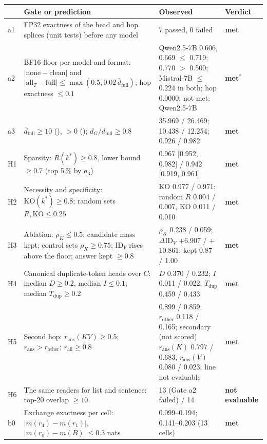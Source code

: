 \begin{tabular}{p{}p{}p{}p{}}
\toprule
 & Gate or prediction & Observed & Verdict \\
\midrule
a1 & FP32 exactness of the head and hop splices (unit tests) before any model & 7 passed, 0 failed & \textbf{met} \\
a2 & BF16 floor per model and format: $|\text{none}-\text{clean}|$ and $|\text{all}_T-\text{full}| \leq \max(0.5, 0.02\,\bar d_{\mathrm{full}})$; hop exactness $\leq 0.1$ & Qwen2.5-7B \fmtOpt{} 0.606, 0.669 $\leq$ 0.719; \fmtPost{} 0.770 $>$ 0.500; Mistral-7B $\leq$ 0.224 in both; hop 0.0000; not met: Qwen2.5-7B \fmtPost{} & \textbf{met}$^*$ \\
a3 & $\bar d_{\mathrm{full}} \geq 10$ (\fmtOpt{}), $> 0$ (\fmtPost{}); $d_G/d_{\mathrm{full}} \geq 0.8$ & 35.969 / 26.469; 10.438 / 12.254; 0.926 / 0.982 & \textbf{met} \\
\midrule
H1 & Sparsity: $R(k^*) \geq 0.8$, lower bound $\geq 0.7$ (top 5\,\% by $a_3$) & 0.967 [0.952, 0.982] / 0.942 [0.919, 0.961] & \textbf{met} \\
H2 & Necessity and specificity: $\mathrm{KO}(k^*) \geq 0.8$; random sets $R, \mathrm{KO} \leq 0.25$ & KO 0.977 / 0.971; random $R$ 0.004 / 0.007, KO 0.011 / 0.010 & \textbf{met} \\
H3 & Ablation: $\rho_K \leq 0.5$; candidate mass kept; control sets $\rho_K \geq 0.75$; $\mathrm{ID}_V$ rises above the floor; answer kept $\geq 0.8$ & $\rho_K$ 0.238 / 0.059; $\Delta\mathrm{ID}_V$ $+$6.907 / $+$10.861; kept 0.87 / 1.00 & \textbf{met} \\
H4 & Canonical duplicate-token heads over $C$: median $D \geq 0.2$, median $I \leq 0.1$; median $T_{\mathrm{dup}} \geq 0.2$ & $D$ 0.370 / 0.232; $I$ 0.011 / 0.022; $T_{\mathrm{dup}}$ 0.459 / 0.433 & \textbf{met} \\
H5 & Second hop: $r_{\mathrm{ans}}(KV) \geq 0.5$; $r_{\mathrm{ans}} > r_{\mathrm{other}}$; $r_{\mathrm{all}} \geq 0.8$ & 0.899 / 0.859; $r_{\mathrm{other}}$ 0.118 / 0.165; secondary (not scored) $r_{\mathrm{ans}}(K)$ 0.797 / 0.683, $r_{\mathrm{ans}}(V)$ 0.080 / 0.023; \fmtPost{} line not evaluable & \textbf{met} \\
H6 & The same readers for list and sentence: top-20 overlap $\geq 10$ & 13 (Gate a2 failed) / 14 & \textbf{not evaluable} \\
\midrule
b0 & Exchange exactness per cell: $|m(r_4)-m(r_1)|$, $|m(r_0)-m(B)| \leq 0.3$ nats & 0.099--0.194; 0.141--0.203 (13 cells) & \textbf{met} \\

\end{tabular}
